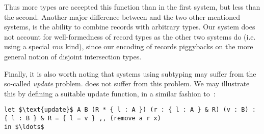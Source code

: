 Thus more types are accepted this function than in the first system, but less than the second. 
Another major difference between \name and the two other mentioned systems, is the ability to 
combine records with arbitrary types.
Our system does not account for well-formedness of record types as the other two systems do 
(i.e. using a special \emph{row} kind), since our encoding of records piggybacks on the more
general notion of disjoint intersection types. 

Finally, it is also worth noting that systems using subtyping may suffer from the so-called 
\emph{update} problem.
\name does not suffer from this problem. 
We may illustrate this by defining a suitable update function, in a similar fashion 
to~\cite{leijen2005extensible}:
\begin{lstlisting}[mathescape=true]
let $\text{update}$ A B (R * { l : A }) (r : { l : A } & R) (v : B) : { l : B } & R = { l = v } ,, (remove a r x) 
in $\ldots$ 
\end{lstlisting}



